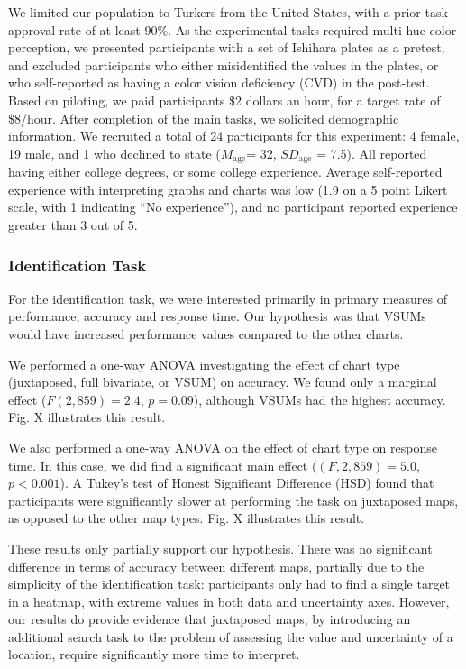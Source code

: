 \documentclass{vgtc}                          %
\begin{document}
We limited our population to Turkers from the United States, with a prior task approval rate of at least 90\%. As the experimental tasks required multi-hue color perception, we presented participants with a set of Ishihara plates as a pretest, and excluded participants who either misidentified the values in the plates, or who self-reported as having a color vision deficiency (CVD) in the post-test. Based on piloting, we paid participants \$2 dollars an hour, for a target rate of \$8/hour. After completion of the main tasks, we solicited demographic information. We recruited a total of 24 participants for this experiment: 4 female, 19 male, and 1 who declined to state ($M_{\text{age}}$= 32, $SD_{\text{age}}$ = 7.5). All reported having either college degrees, or some college experience. Average self-reported experience with interpreting graphs and charts was low (1.9 on a 5 point Likert scale, with 1 indicating ``No experience''), and no participant reported experience greater than 3 out of 5.

\subsubsection{Identification Task}

For the identification task, we were interested primarily in primary measures of performance, accuracy and response time. Our hypothesis was that VSUMs would have increased performance values compared to the other charts.

We performed a one-way ANOVA investigating the effect of chart type (juxtaposed, full bivariate, or VSUM) on accuracy. We found only a marginal effect ($F(2,859) = 2.4$, $p=0.09$), although VSUMs had the highest accuracy. Fig. X illustrates this result.

We also performed a one-way ANOVA on the effect of chart type on response time. In this case, we did find a significant main effect ($(F,2,859) = 5.0$, $p<0.001$). A Tukey's test of Honest Significant Difference (HSD) found that participants were significantly slower at performing the task on juxtaposed maps, as opposed to the other map types. Fig. X illustrates this result.

These results only partially support our hypothesis. There was no significant difference in terms of accuracy between different maps, partially due to the simplicity of the identification task: participants only had to find a single target in a heatmap, with extreme values in both data and uncertainty axes. However, our results do provide evidence that juxtaposed maps, by introducing an additional search task to the problem of assessing the value and uncertainty of a location, require significantly more time to interpret.
\end{document}
